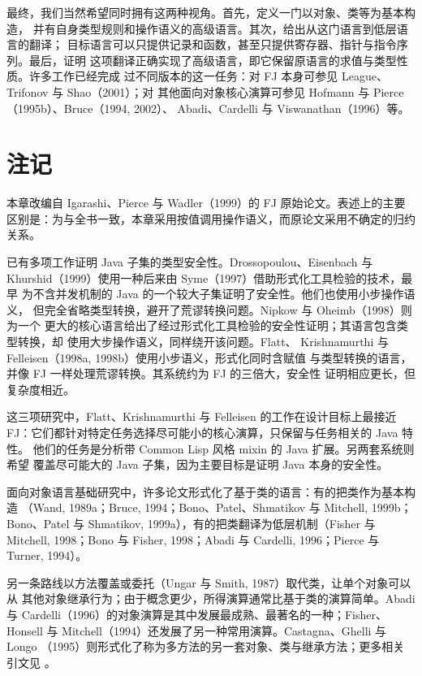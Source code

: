 最终，我们当然希望同时拥有这两种视角。首先，定义一门以对象、类等为基本构造，
并有自身类型规则和操作语义的高级语言。其次，给出从这门语言到低层语言的翻译；
目标语言可以只提供记录和函数，甚至只提供寄存器、指针与指令序列。最后，证明
这项翻译正确实现了高级语言，即它保留原语言的求值与类型性质。许多工作已经完成
过不同版本的这一任务：对 FJ 本身可参见 League、Trifonov 与 Shao（2001）；对
其他面向对象核心演算可参见 Hofmann 与 Pierce（1995b）、Bruce（1994, 2002）、
Abadi、Cardelli 与 Viswanathan（1996）等。

\section{注记}
\label{sec:19.7}

本章改编自 Igarashi、Pierce 与 Wadler（1999）的 FJ 原始论文。表述上的主要
区别是：为与全书一致，本章采用按值调用操作语义，而原论文采用不确定的归约
关系。

已有多项工作证明 Java 子集的类型安全性。Drossopoulou、Eisenbach 与
Khurshid（1999）使用一种后来由 Syme（1997）借助形式化工具检验的技术，最早
为不含并发机制的 Java 的一个较大子集证明了安全性。他们也使用小步操作语义，
但完全省略类型转换，避开了荒谬转换问题。Nipkow 与 Oheimb（1998）则为一个
更大的核心语言给出了经过形式化工具检验的安全性证明；其语言包含类型转换，却
使用大步操作语义，同样绕开该问题。Flatt、
Krishnamurthi 与 Felleisen（1998a, 1998b）使用小步语义，形式化同时含赋值
与类型转换的语言，并像 FJ 一样处理荒谬转换。其系统约为 FJ 的三倍大，安全性
证明相应更长，但复杂度相近。

这三项研究中，Flatt、Krishnamurthi 与 Felleisen 的工作在设计目标上最接近
FJ：它们都针对特定任务选择尽可能小的核心演算，只保留与任务相关的 Java 特性。
他们的任务是分析带 Common Lisp 风格 mixin 的 Java 扩展。另两套系统则希望
覆盖尽可能大的 Java 子集，因为主要目标是证明 Java 本身的安全性。

面向对象语言基础研究中，许多论文形式化了基于类的语言：有的把类作为基本构造
（Wand, 1989a；Bruce, 1994；Bono、Patel、Shmatikov 与 Mitchell, 1999b；
Bono、Patel 与 Shmatikov, 1999a），有的把类翻译为低层机制（Fisher 与
Mitchell, 1998；Bono 与 Fisher, 1998；Abadi 与 Cardelli, 1996；Pierce 与
Turner, 1994）。

另一条路线以方法覆盖或委托（Ungar 与 Smith, 1987）取代类，让单个对象可以从
其他对象继承行为；由于概念更少，所得演算通常比基于类的演算简单。Abadi 与
Cardelli（1996）的对象演算是其中发展最成熟、最著名的一种；Fisher、Honsell
与 Mitchell（1994）还发展了另一种常用演算。Castagna、Ghelli 与 Longo
（1995）则形式化了称为多方法的另一套对象、类与继承方法；更多相关引文见
。

